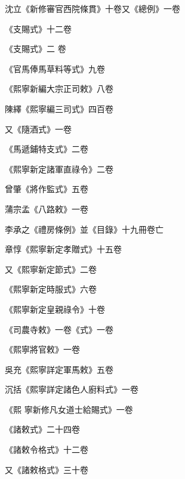 \begin{pinyinscope}
 沈立《新修審官西院條貫》十卷又《總例》一卷



 《支賜式》十二卷



 《支賜式》二
 卷



 《官馬俸馬草料等式》九卷



 《熙寧新編大宗正司敕》八卷



 陳繹《熙寧編三司式》四百卷



 又《隨酒式》一卷



 《馬遞鋪特支式》二卷



 《熙寧新定諸軍直祿令》二卷



 曾肇《將作監式》五卷



 蒲宗孟《八路敕》一卷



 李承之《禮房條例》並《目錄》十九冊卷亡



 章惇《熙寧新定孝贈式》十五卷



 又《熙寧新定節式》二卷



 《熙寧新定時服式》六卷



 《熙寧新定皇親祿令》十卷



 《司農寺敕》一卷《式》一卷



 《熙寧將官敕》一卷



 吳充《熙寧詳定軍馬敕》五卷



 沉括《熙寧詳定諸色人廚料式》一卷



 《熙
 寧新修凡女道士給賜式》一卷



 《諸敕式》二十四卷



 《諸敕令格式》十二卷



 又《諸敕格式》三十卷




\end{pinyinscope}

